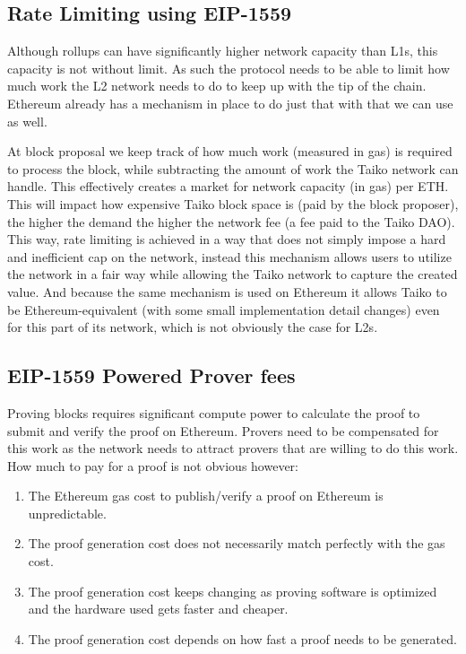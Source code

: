 \documentclass[9pt,oneside]{amsart}
\begin{document}
\begin{multicols}{2}
\subsection{Rate Limiting using EIP-1559}\label{sec:eip1559-propose}
Although rollups can have significantly higher network capacity than L1s, this capacity is not without limit. As such the protocol needs to be able to limit how much work the L2 network needs to do to keep up with the tip of the chain. Ethereum already has a mechanism in place to do just that with \cite{eip1559} that we can use as well. 

At block proposal we keep track of how much work (measured in gas) is required to process the block, while subtracting the amount of work the Taiko network can handle. This effectively creates a market for network capacity (in gas) per ETH. This will impact how expensive Taiko block space is (paid by the block proposer), the higher the demand the higher the network fee (a fee paid to the Taiko DAO). This way, rate limiting is achieved in a way that does not simply impose a hard and inefficient cap on the network, instead this mechanism allows users to utilize the network in a fair way while allowing the Taiko network to capture the created value. And because the same mechanism is used on Ethereum it allows Taiko to be Ethereum-equivalent (with some small implementation detail changes) even for this part of its network, which is not obviously the case for L2s.

\subsection{EIP-1559 Powered Prover fees}\label{sec:eip1559-proof}
Proving blocks requires significant compute power to calculate the proof to submit and verify the proof on Ethereum. Provers need to be compensated for this work as the network needs to attract provers that are willing to do this work. How much to pay for a proof is not obvious however:
\begin{enumerate}
\item The Ethereum gas cost to publish/verify a proof on Ethereum is unpredictable.
\item The proof generation cost does not necessarily match perfectly with the gas cost.
\item The proof generation cost keeps changing as proving software is optimized and the hardware used gets faster and cheaper.
\item The proof generation cost depends on how fast a proof needs to be generated.
\end{enumerate}


\end{multicols}
\end{document}
